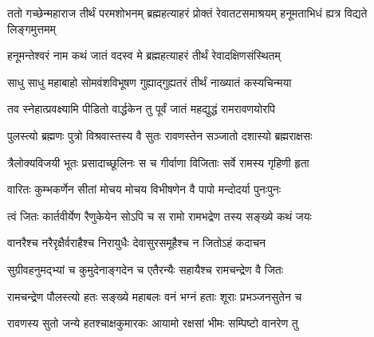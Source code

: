 
\vakta{}
\shrota{}
\tags{}
\notes{}

\storymeta






\threelineshloka
{ततो गच्छेन्महाराज तीर्थं परमशोभनम्}
{ब्रह्महत्याहरं प्रोक्तं रेवातटसमाश्रयम्}
{हनूमताभिधं ह्यत्र विद्यते लिङ्गमुत्तमम्}%


\twolineshloka
{हनूमन्तेश्वरं नाम कथं जातं वदस्व मे}
{ब्रह्महत्याहरं तीर्थं रेवादक्षिणसंस्थितम्}%


\twolineshloka
{साधु साधु महाबाहो सोमवंशविभूषण}
{गुह्याद्गुह्यतरं तीर्थं नाख्यातं कस्यचिन्मया}%

\twolineshloka
{तव स्नेहात्प्रवक्ष्यामि पीडितो वार्द्धकेन तु}
{पूर्वं जातं महद्युद्धं रामरावणयोरपि}%

\twolineshloka
{पुलस्त्यो ब्रह्मणः पुत्रो विश्रवास्तस्य वै सुतः}
{रावणस्तेन सञ्जातो दशास्यो ब्रह्मराक्षसः}%

\twolineshloka
{त्रैलोक्यविजयी भूतः प्रसादाच्छूलिनः स च}
{गीर्वाणा विजिताः सर्वे रामस्य गृहिणी हृता}%

\twolineshloka
{वारितः कुम्भकर्णेन सीतां मोचय मोचय}
{विभीषणेन वै पापो मन्दोदर्या पुनःपुनः}%

\twolineshloka
{त्वं जितः कार्तवीर्येण रैणुकेयेन सोऽपि च}
{स रामो रामभद्रेण तस्य सङ्ख्ये कथं जयः}%


\twolineshloka
{वानरैश्च नरैरृक्षैर्वराहैश्च निरायुधैः}
{देवासुरसमूहैश्च न जितोऽहं कदाचन}%


\twolineshloka
{सुग्रीवहनुमद्भ्यां च कुमुदेनाङ्गदेन च}
{एतैरन्यैः सहायैश्च रामचन्द्रेण वै जितः}%

\twolineshloka
{रामचन्द्रेण पौलस्त्यो हतः सङ्ख्ये महाबलः}
{वनं भग्नं हताः शूराः प्रभञ्जनसुतेन च}%

\twolineshloka
{रावणस्य सुतो जन्ये हतश्चाक्षकुमारकः}
{आयामो रक्षसां भीमः सम्पिष्टो वानरेण तु}%

